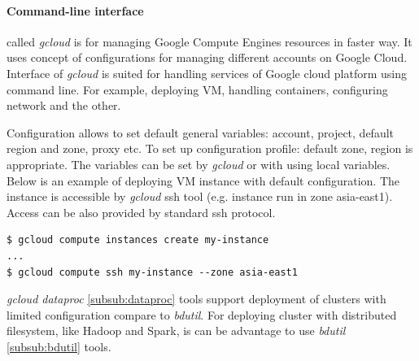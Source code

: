 \documentclass[a4paper,12pt,oneside]{report}
\begin{document}
\begin{table}[!htbp]
		\caption{Overview of Google Cloud platform}
		\label{tab:google_all}
	\end{table}
	
	\paragraph{Command-line interface} called \textit{gcloud}  is for managing
	Google Compute Engines resources in faster way. It uses concept of
	configurations for managing different accounts on Google Cloud. 
	Interface of \textit{gcloud} is suited for handling services of Google cloud
	platform using command line. For example, 
	deploying VM, handling containers, configuring network and the other.
	
	Configuration allows to set default general variables: account, project, default
	region 
	and zone, proxy etc. To set up configuration profile: default zone, region is
	appropriate. 
	The variables can be set by \textit{gcloud} or with using 
	local variables.
	Below is an example of deploying VM instance with default configuration. The
	instance 
	is accessible by \textit{gcloud} ssh tool (e.g. instance run in zone asia-east1).
	Access can be also provided 
	by standard ssh protocol.
	\begin{footnotesize}
		\begin{lstlisting}[style=mybash]
$ gcloud compute instances create my-instance
...
$ gcloud compute ssh my-instance --zone asia-east1
		\end{lstlisting}
	\end{footnotesize}
	\textit{gcloud dataproc} \ref{subsub:dataproc} tools support deployment of
	clusters with limited configuration compare to \textit{bdutil}. For deploying 
	cluster with distributed filesystem, like Hadoop and Spark, is can be advantage
	to use \textit{bdutil} \ref{subsub:bdutil} tools. 
	
\end{document}
